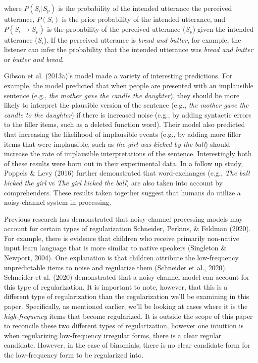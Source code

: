 \documentclass[10pt, letterpaper]{article}
\begin{document}
\noindent where \(P(S_i|S_p)\) is the probability of the intended
utterance the perceived utterance, \(P(S_i)\) is the prior probability
of the intended utterance, and \(P(S_i \to S_p)\) is the probability of
the perceived utterance (\(S_p\)) given the intended utterance
(\(S_i\)). If the perceived utterance is \emph{bread and butter}, for
example, the listener can infer the probability that the intended
utterance was \emph{bread and butter} or \emph{butter and bread}.

Gibson et al. (2013a)'s model made a variety of interesting predictions.
For example, the model predicted that when people are presented with an
implausible sentence (e.g., \emph{the mother gave the candle the
daughter}), they should be more likely to interpret the plausible
version of the sentence (e.g., \emph{the mother gave the candle to the
daughter}) if there is increased noise (e.g., by adding syntactic errors
to the filler items, such as a deleted function word). Their model also
predicted that increasing the likelihood of implausible events (e.g., by
adding more filler items that were implausible, such as \emph{the girl
was kicked by the ball}) should increase the rate of implausible
interpretations of the sentence. Interestingly both of these results
were born out in their experimental data. In a follow up study, Poppels
\& Levy (2016) further demonstrated that word-exchanges (e.g., \emph{The
ball kicked the girl} vs \emph{The girl kicked the ball}) are also taken
into account by comprehenders. These results taken together suggest that
humans do utilize a noisy-channel system in processing.

Previous research has demonstrated that noisy-channel processing models
may account for certain types of regularization Schneider, Perkins, \&
Feldman (2020). For example, there is evidence that children who receive
primarily non-native input learn language that is more similar to native
speakers (Singleton \& Newport, 2004). One explanation is that children
attribute the low-frequency unpredictable items to noise and regularize
them (Schneider et al., 2020). Schneider et al. (2020) demonstrated that
a noisy-channel model can account for this type of regularization. It is
important to note, however, that this is a different type of
regularization than the regularization we'll be examining in this paper.
Specifically, as mentioned earlier, we'll be looking at cases where it
is the \emph{high-frequency} items that become regularized. It is
outside the scope of this paper to reconcile these two different types
of regularization, however one intuition is when regularizing
low-frequency irregular forms, there is a clear regular candidate.
However, in the case of binomials, there is no clear candidate form for
the low-frequency form to be regularized into.
\end{document}
